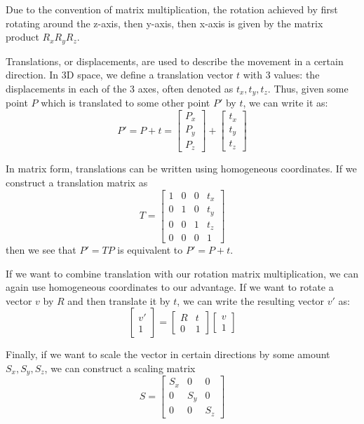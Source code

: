 \documentclass[a4paper, 12pt]{article}
\begin{document}
Due to the convention of matrix multiplication, the rotation achieved by first rotating around the z-axis, then y-axis, then x-axis is given by the matrix product $R_xR_yR_z$.

Translations, or displacements, are used to describe the movement in a certain direction. In 3D space, we define a translation vector $t$ with 3 values: the displacements in each of the 3 axes, often denoted as $t_x, t_y, t_z$. Thus, given some point $P$ which is translated to some other point $P'$ by $t$, we can write it as:
\[ P' = P + t = \begin{bmatrix}P_x\\P_y\\P_z\end{bmatrix} + \begin{bmatrix}t_x\\t_y\\t_z\end{bmatrix}\]

In matrix form, translations can be written using homogeneous coordinates. If we construct a translation matrix as
\[ T = \begin{bmatrix}
1 & 0 & 0 & t_x \\0 & 1 & 0 & t_y \\0 & 0 & 1 & t_z \\ 0 & 0 & 0 & 1
\end{bmatrix}\]
then we see that $P'=TP$ is equivalent to $P' = P+t$.


If we want to combine translation with our rotation matrix multiplication, we can again use homogeneous coordinates to our advantage. If we want to rotate a vector $v$ by $R$ and then translate it by $t$, we can write the resulting vector $v'$ as:
\[ \begin{bmatrix}v'\\1\end{bmatrix} = \begin{bmatrix}
R & t \\ 0 & 1
\end{bmatrix}\begin{bmatrix}
v \\ 1
\end{bmatrix}\]

Finally, if we want to scale the vector in certain directions by some amount $S_x, S_y, S_z$, we can construct a scaling matrix 
\[S = \begin{bmatrix}
S_x & 0 & 0 \\ 0 & S_y & 0 \\ 0 & 0 & S_z
\end{bmatrix}\]
\end{document}
